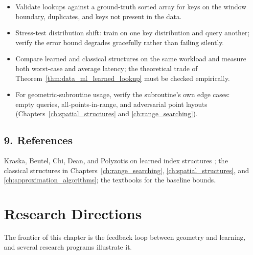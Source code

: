 \begin{itemize}
\item Validate lookups against a ground-truth sorted array for keys on the
  window boundary, duplicates, and keys not present in the data.
\item Stress-test distribution shift: train on one key distribution and
  query another; verify the error bound degrades gracefully rather than
  failing silently.
\item Compare learned and classical structures on the same workload and
  measure both worst-case and average latency; the theoretical trade of
  Theorem~\ref{thm:data_ml_learned_lookup} must be checked empirically.
\item For geometric-subroutine usage, verify the subroutine's own edge
  cases: empty queries, all-points-in-range, and adversarial point layouts
  (Chapters~\ref{ch:spatial_structures} and \ref{ch:range_searching}).
\end{itemize}

\subsection{9. References}

Kraska, Beutel, Chi, Dean, and Polyzotis on learned index structures
\cite{kraska2018}; the classical structures in Chapters~\ref{ch:range_searching},
\ref{ch:spatial_structures}, and \ref{ch:approximation_algorithms}; the
textbooks \cite{cormen2009,deberg2008} for the baseline bounds.


\section{Research Directions}
\label{sec:data_ml_research}

The frontier of this chapter is the feedback loop between geometry and
learning, and several research programs illustrate it.

